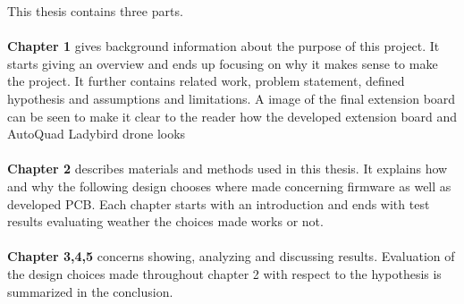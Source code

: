 This thesis contains three parts.\\ \\
\textbf{Chapter 1} gives background information about the purpose of this project. It starts giving an overview and ends up focusing on why it makes sense to make the project. It further contains related work,  problem statement, defined hypothesis and assumptions and limitations. A image of the final extension board can be seen to make it clear to the reader how the developed extension board and AutoQuad Ladybird drone looks\\ \\
\textbf{Chapter 2} describes materials and methods used in this thesis. It explains how and why the following design chooses where made concerning firmware as well as developed PCB. Each chapter starts with an introduction and ends with test results evaluating weather the choices made works or not.\\ \\
\textbf{Chapter 3,4,5} concerns showing, analyzing and discussing results. Evaluation of the design choices made throughout chapter 2 with respect to the hypothesis is summarized in the conclusion. \\
